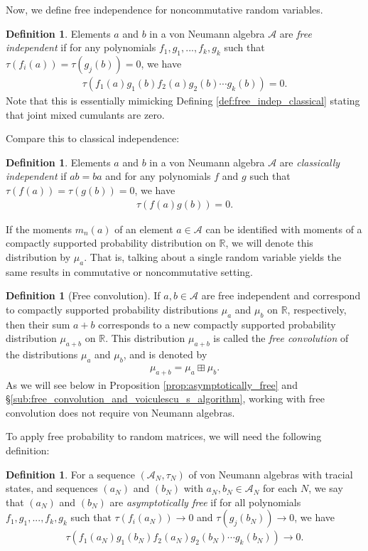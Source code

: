 \documentclass[letterpaper,11pt,oneside,reqno]{amsart}
\numberwithin{equation}{section}
\theoremstyle{definition}
\newtheorem{definition}[proposition]{Definition}
\begin{document}
Now, we define free independence for noncommutative random variables. 
\begin{definition}
Elements $a$ and $b$ in a von Neumann algebra $\mathcal{A}$ are \emph{free independent} if for any polynomials $f_1,g_1,..., f_k, g_k$ such that $\tau(f_i(a))=\tau(g_j(b))=0$, we have 
\begin{align*}
    \tau(f_1(a)g_1(b)f_2(a)g_2(b)\cdots g_k(b))=0.
\end{align*}
Note that this is essentially mimicking Defining \ref{def:free_indep_classical} 
stating that joint mixed cumulants are zero. 
\end{definition}
Compare this to classical independence:
\begin{definition}
Elements $a$ and $b$ in a von Neumann algebra $\mathcal{A}$ are \emph{classically independent} if $ab=ba$ and for any polynomials $f$ and $g$ such that $\tau(f(a))=\tau(g(b))=0$, we have 
\begin{align*}
    \tau(f(a)g(b))=0.
\end{align*}
\end{definition}
If the moments $m_n(a)$ of an element $a\in\mathcal{A}$
can be identified with moments of a compactly supported probability distribution on $\mathbb{R}$,
we will denote this distribution by $\mu_a$.
That is, talking about a single random variable yields the same results
in commutative or noncommutative setting.
\begin{definition}[Free convolution]\label{def:free_convolution}
	If $a,b\in\mathcal{A}$ are free independent and correspond to compactly
	supported probability distributions $\mu_a$ and $\mu_b$ on $\mathbb{R}$, respectively,
	then their sum $a+b$ corresponds to a new 
	compactly
	supported probability distribution $\mu_{a+b}$ on $\mathbb{R}$. 
	This distribution $\mu_{a+b}$ is called the \emph{free convolution}
	of the distributions $\mu_a$ and $\mu_b$, and is denoted by 
	\begin{align*}
		\mu_{a+b}=\mu_a\boxplus\mu_b.
	\end{align*}
	As we will see below in Proposition \ref{prop:asymptotically_free}
	and \S \ref{sub:free_convolution_and_voiculescu_s_algorithm}, working with free convolution 
	does not require von Neumann algebras.
\end{definition}


To apply free probability to random matrices, we will need the following definition:
\begin{definition}
For a sequence $(\mathcal{A}_N,\tau_N)$ of von Neumann algebras with tracial states, and sequences $(a_N)$ and $(b_N)$ with $a_N, b_N\in \mathcal{A}_N$ 
for each $N$, we say that $(a_N)$ and $(b_N)$ are \emph{asymptotically free} if 
for all polynomials $f_1,g_1,..., f_k, g_k$ such that $\tau(f_i(a_N))\to 0$ and $\tau(g_j(b_N))\to0$, we have 
\begin{align*}
    \tau(f_1(a_N)g_1(b_N)f_2(a_N)g_2(b_N)\cdots g_k(b_N))\to 0.
\end{align*}
\end{definition}
\end{document}
